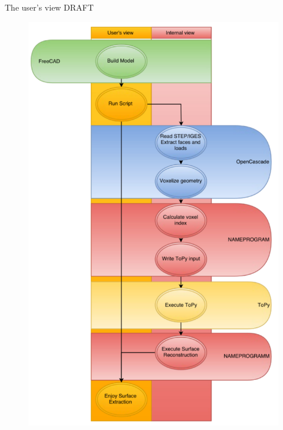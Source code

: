 \begin{frame}{The user's view DRAFT}
\begin{minipage}{0.65\textwidth}
\begin{overlayarea}{\textwidth}{.9\textheight}
\begin{figure}[htp]
\label{fig: FreeCADColoring}
\end{figure}
\end{overlayarea}
\end{minipage}
\begin{minipage}{0.3\textwidth}
\begin{overlayarea}{\textwidth}{.9\textheight}
\begin{figure}[htp]
	\centering
	\includegraphics[scale=.25]{Pictures/TopOp/FlowDiagram2.pdf}
\end{figure}
\end{overlayarea}
\end{minipage}
\end{frame}

